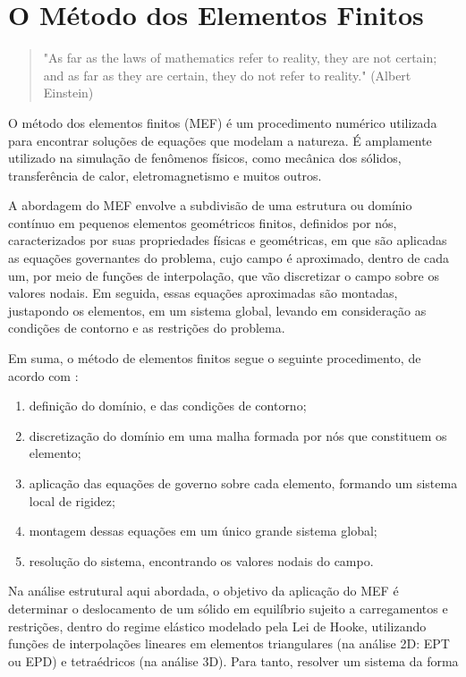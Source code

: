 \chapter{O Método dos Elementos Finitos}

\begin{quote}
    "As far as the laws of mathematics refer to reality, they are not certain; and as far as they are certain, they do not refer to reality." (Albert Einstein)
\end{quote}

O método dos elementos finitos (MEF) é um procedimento numérico utilizada para encontrar soluções de equações que modelam a natureza. É amplamente utilizado na simulação de fenômenos físicos, como mecânica dos sólidos, transferência de calor, eletromagnetismo e muitos outros. \cite{Onate}

A abordagem do MEF envolve a subdivisão de uma estrutura ou domínio contínuo em pequenos elementos geométricos finitos, definidos por nós, caracterizados por suas propriedades físicas e geométricas, em que são aplicadas as equações governantes do problema, cujo campo é aproximado, dentro de cada um, por meio de funções de interpolação, que vão discretizar o campo sobre os valores nodais. Em seguida, essas equações aproximadas são montadas, justapondo os elementos, em um sistema global, levando em consideração as condições de contorno e as restrições do problema. \cite{LIU}

Em suma, o método de elementos finitos segue o seguinte procedimento, de acordo com :

\begin{enumerate}
    \item definição do domínio, e das condições de contorno;
    \item discretização do domínio em uma malha formada por nós que constituem os elemento;
    \item aplicação das equações de governo sobre cada elemento, formando um sistema local de rigidez;
    \item montagem dessas equações em um único grande sistema global;
    \item resolução do sistema, encontrando os valores nodais do campo.
\end{enumerate}

Na análise estrutural aqui abordada, o objetivo da aplicação do MEF é determinar o deslocamento de um sólido em equilíbrio sujeito a carregamentos e restrições, dentro do regime elástico modelado pela Lei de Hooke, utilizando funções de interpolações lineares em elementos triangulares (na análise 2D: EPT ou EPD) e tetraédricos (na análise 3D). Para tanto, resolver um sistema da forma

